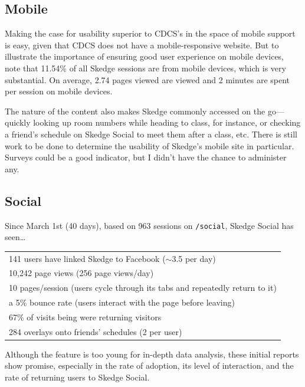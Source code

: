 {\subsection{Mobile}

Making the case for usability superior to CDCS's in the space of mobile support is easy, given that CDCS does not have a mobile-responsive website. But to illustrate the importance of ensuring good user experience on mobile devices, note that 11.54\% of all Skedge sessions are from mobile devices, which is very substantial. On average, 2.74 pages viewed are viewed and 2 minutes are spent per session on mobile devices.

The nature of the content also makes Skedge commonly accessed on the go---quickly looking up room numbers while heading to class, for instance, or checking a friend's schedule on Skedge Social to meet them after a class, etc. There is still work to be done to determine the usability of Skedge's mobile site in particular. Surveys could be a good indicator, but I didn't have the chance to administer any.

\subsection{Social}

Since March 1st (40 days), based on 963 sessions on {\tt /social}, Skedge Social has seen\ldots

{\renewcommand{\arraystretch}{1.5}
\singlespacing
\begin{center}
\begin{tabular}{l}
  \hline
  141 users have linked Skedge to Facebook ($\sim$3.5 per day) \\
  10,242 page views (256 page views/day)  \\
  10 pages/session (users cycle through its tabs and repeatedly return to it) \\
  a 5\% bounce rate (users interact with the page before leaving) \\
  67\% of visits being were returning visitors \\
  284 overlays onto friends’ schedules (2 per user) \\
  \hline
\end{tabular}
\end{center}
\doublespacing

\vspace{5pt}

\noindent Although the feature is too young for in-depth data analysis, these initial reports show promise, especially in the rate of adoption, its level of interaction, and the rate of returning users to Skedge Social.

}}
